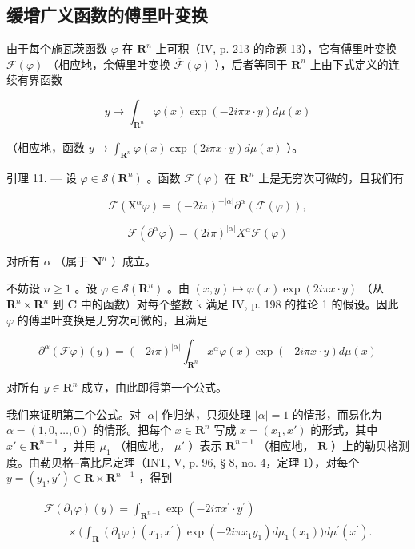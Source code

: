 \subsection{缓增广义函数的傅里叶变换}

由于每个施瓦茨函数 \(\varphi\) 在 \(\mathbf{R}^n\) 上可积（IV, p. 213 的命题 13），它有傅里叶变换 \(\mathcal{F}(\varphi)\) （相应地，余傅里叶变换 \(\overline{\mathcal{F}}(\varphi)\) ），后者等同于 \(\mathbf{R}^n\) 上由下式定义的连续有界函数

\[
y \mapsto \int_ {\mathbf {R} ^ {n}} \varphi (x) \exp (- 2 i \pi x \cdot y) d \mu (x)
\]

（相应地，函数 \(y \mapsto \int_{\mathbf{R}^n} \varphi(x) \exp(2i\pi x \cdot y) d\mu(x)\) ）。

引理 11. --- 设 \(\varphi\in\mathcal{S}(\mathbf{R}^{n})\) 。函数 \(\mathcal{F}(\varphi)\) 在 \(\mathbf{R}^{n}\) 上是无穷次可微的，且我们有

\[
\mathcal {F} (\mathrm{X} ^ {\alpha} \varphi) = (- 2 i \pi) ^ {- | \alpha |} \partial^ {\alpha} (\mathcal {F} (\varphi)),
\]

\[
\mathcal {F} (\partial^ {\alpha} \varphi) = (2 i \pi) ^ {| \alpha |} X ^ {\alpha} \mathcal {F} (\varphi)
\]

对所有 \(\alpha\) （属于 \(\mathbf{N}^n\) ）成立。

不妨设 \(n \geqslant 1\) 。设 \(\varphi \in \mathcal{S}(\mathbf{R}^{n})\) 。由 \((x, y) \mapsto \varphi(x) \exp(2i\pi x \cdot y)\) （从 \(\mathbf{R}^{n} \times \mathbf{R}^{n}\) 到 \(\mathbf{C}\) 中的函数）对每个整数 k 满足 IV, p. 198 的推论 1 的假设。因此 \(\varphi\) 的傅里叶变换是无穷次可微的，且满足

\[
\partial^ {\alpha} (\mathcal {F} \varphi) (y) = (- 2 i \pi) ^ {| \alpha |} \int_ {\mathbf {R} ^ {n}} x ^ {\alpha} \varphi (x) \exp (- 2 i \pi x \cdot y) d \mu (x)
\]

对所有 \(y \in \mathbf{R}^{n}\) 成立，由此即得第一个公式。

我们来证明第二个公式。对 \(|\alpha|\) 作归纳，只须处理 \(|\alpha| = 1\) 的情形，而易化为 \(\alpha = (1,0,\ldots,0)\) 的情形。把每个 \(x \in \mathbf{R}^n\) 写成 \(x = (x_1,x')\) 的形式，其中 \(x' \in \mathbf{R}^{n-1}\) ，并用 \(\mu_1\) （相应地， \(\mu'\) ）表示 \(\mathbf{R}^{n-1}\) （相应地， \(\mathbf{R}\) ）上的勒贝格测度。由勒贝格–富比尼定理（INT, V, p. 96, § 8, no. 4，定理 1），对每个 \(y = (y_1,y') \in \mathbf{R} \times \mathbf{R}^{n-1}\) ，得到

\[
\begin{array}{l} \mathcal {F} (\partial_ {1} \varphi) (y) = \int_ {\mathbf {R} ^ {n - 1}} \exp (- 2 i \pi   x ^ {\prime} \cdot y ^ {\prime}) \\ \qquad \times \Big (\int_ {\mathbf {R}} (\partial_ {1} \varphi) (x _ {1}, x ^ {\prime}) \exp (- 2 i \pi   x _ {1} y _ {1}) d \mu_ {1} (x _ {1}) \Big) d \mu^ {\prime} (x ^ {\prime}). \end{array}
\]


